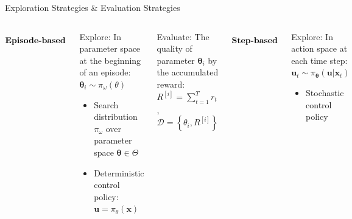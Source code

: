 \documentclass[10pt]{beamer}
\begin{document}



\begin{frame}{Exploration Strategies \& Evaluation Strategies}

  \begin{columns}[T,onlytextwidth]
  
        $$\text{\textbf{Episode-based}}$$

        \begin{alertblock}{Explore:}
        In parameter space at the beginning of an episode: 
        ${\bm{\theta}}_i \sim \pi_\omega(\theta)$

        \begin{itemize}
        \item Search distribution $\pi_\omega$ over parameter space ${\bm{\theta}} \in \Theta$
        \item Deterministic control policy: $\bm{u} = \pi_\theta(\bm{x})$
        \end{itemize}

        \end{alertblock}

        \begin{exampleblock}{Evaluate:}
        The quality of parameter ${\bm{\theta}}_i$ by the accumulated reward:
        $R^{[i]} = \sum_{t=1}^T {r_t}$, $\mathcal{D} = \left\{ \theta_i, R^{[i]} \right\}$
        \end{exampleblock}

        $$\text{\textbf{Step-based}}$$

        \begin{alertblock}{Explore:}
        In action space at each time step: $\bm{u}_t \sim \pi_{\bm{\theta}}(\bm{u} | \bm{x}_t)$

        \begin{itemize}
        \item Stochastic control policy
        \end{itemize}


\end{alertblock}
\end{columns}
\end{frame}
\end{document}
